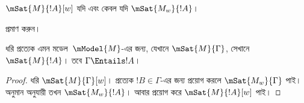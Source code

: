 \documentclass[../../../include/open-logic-section]{subfiles}
\begin{document}
\begin{prop}
  $\mSat{M}{!A}[w]$ যদি এবং কেবল যদি $\mSat{M_w}{!A}$।
\end{prop}

\begin{prob}
   প্রমাণ করুন।
\end{prob}

\begin{prop}
  ধরি প্রত্যেক এমন মডেল~$\mModel{M}$-এর জন্য, যেখানে
  $\mSat{M}{\Gamma}$, সেখানে $\mSat{M}{!A}$। তবে
  $\Gamma \Entails !A$।
\end{prop}

\begin{proof}
  ধরি $\mSat{M}{\Gamma}[w]$। প্রত্যেক $!B \in \Gamma$-এর
  জন্য  প্রয়োগ করলে
  $\mSat{M_w}{\Gamma}$ পাই। অনুমান অনুযায়ী তখন
  $\mSat{M_w}{!A}$। আবার  প্রয়োগ করে
  $\mSat{M}{!A}[w]$ পাই।
\end{proof}
\end{document}
